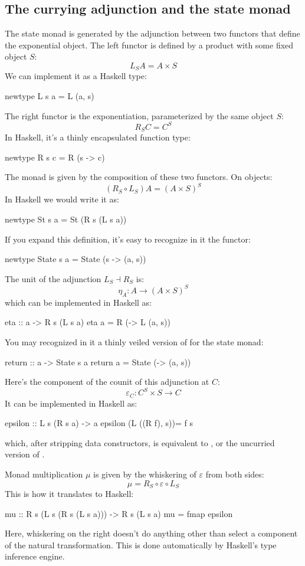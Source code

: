 \documentclass[DaoFP]{subfiles}
\begin{document}
\subsection{The currying adjunction and the state monad}

The state monad is generated by the adjunction between two functors that define the exponential object. The left functor is defined by a product with some fixed object $S$:
\[ L_S A = A \times S \]
We can implement it as a Haskell type:
\begin{haskell}
newtype L s a = L (a, s)
\end{haskell}
The right functor is the exponentiation, parameterized by the same object $S$:
\[ R_S C = C^S \]
In Haskell, it's a thinly encapsulated function type:
\begin{haskell}
newtype R s c = R (s -> c)
\end{haskell}

The monad is given by the composition of these two functors. On objects:
\[(R_S \circ L_S) A = (A \times S)^S \]
In Haskell we would write it as:
\begin{haskell}
newtype St s a = St (R s (L s a))
\end{haskell}
If you expand this definition, it's easy to recognize in it the  functor:
\begin{haskell}
newtype State s a = State (s -> (a, s))
\end{haskell}

The unit of the adjunction $L_S \dashv R_S$ is:
\[ \eta_A \colon A \to (A \times S)^S \]
which can be implemented in Haskell as:
\begin{haskell}
eta :: a -> R s (L s a)
eta a = R (\s -> L (a, s))
\end{haskell}
You may recognized in it a thinly veiled version of  for the state monad:
\begin{haskell}
return :: a -> State s a
return a = State (\s -> (a, s))
\end{haskell}

Here's the component of the counit of this adjunction at $C$:
\[ \varepsilon_C \colon C^S \times S \to C \]
It can be implemented in Haskell as:
\begin{haskell}
epsilon :: L s (R s a) -> a
epsilon (L ((R f), s))= f s
\end{haskell}
which, after stripping data constructors, is equivalent to , or the uncurried version of .

Monad multiplication $\mu$ is given by the whiskering of $\varepsilon$ from both sides:
\[ \mu = R_S \circ \varepsilon \circ L_S \]
This is how it translates to Haskell:
\begin{haskell}
mu :: R s (L s (R s (L s a))) -> R s (L s a)
mu = fmap epsilon
\end{haskell}
Here, whiskering on the right doesn't do anything other than select a component of the natural transformation. This is done automatically by Haskell's type inference engine. 
\end{document}
